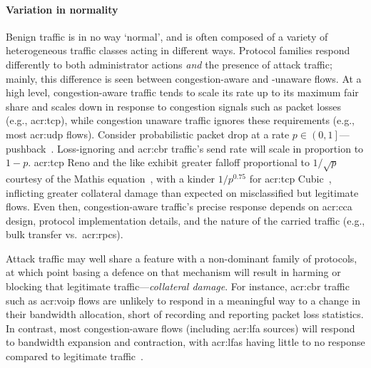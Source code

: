 \paragraph{Variation in normality}
Benign traffic is in no way `normal', and is often composed of a variety of heterogeneous traffic classes acting in different ways.
Protocol families respond differently to both administrator actions \emph{and} the presence of attack traffic; mainly, this difference is seen between congestion-aware and -unaware flows.
At a high level, congestion-aware traffic tends to scale its rate up to its maximum fair share and scales down in response to congestion signals such as packet losses (e.g., \gls{acr:tcp}), while congestion unaware traffic ignores these requirements (e.g., most \gls{acr:udp} flows).
Consider probabilistic packet drop at a rate $p\in\left(0,1\right]$---pushback~\parencite{DBLP:journals/ccr/MahajanBFIPS02a}.
Loss-ignoring and \gls{acr:cbr} traffic's send rate will scale in proportion to $1 - p$.
\gls{acr:tcp} Reno and the like exhibit greater falloff proportional to $1/\sqrt{p}$ courtesy of the Mathis equation~\parencite{DBLP:journals/ccr/MathisSMO97}, with a kinder $1/p^{0.75}$ for \gls{acr:tcp} Cubic~\parencite{rfc8312}, inflicting greater collateral damage than expected on misclassified but legitimate flows.
Even then, congestion-aware traffic's precise response depends on \gls{acr:cca} design, protocol implementation details, and the nature of the carried traffic (e.g., bulk transfer vs.~\glspl{acr:rpc}).

Attack traffic may well share a feature with a non-dominant family of protocols, at which point basing a defence on that mechanism will result in harming or blocking that legitimate traffic---\emph{collateral damage}.
For instance, \gls{acr:cbr} traffic such as \gls{acr:voip} flows are unlikely to respond in a meaningful way to a change in their bandwidth allocation, short of recording and reporting packet loss statistics.
In contrast, most congestion-aware flows (including \gls{acr:lfa} sources) will respond to bandwidth expansion and contraction, with \glspl{acr:lfa} having little to no response compared to legitimate traffic~\parencite{DBLP:conf/ndss/KangGS16}.

